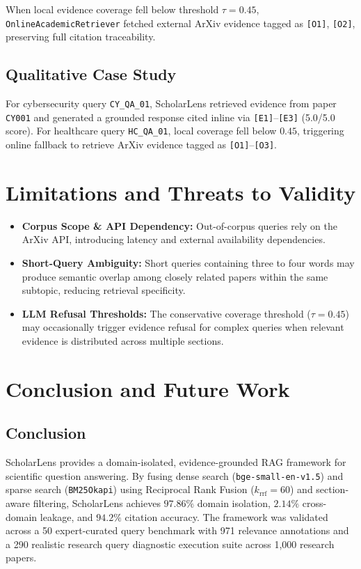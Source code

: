 \documentclass[conference]{IEEEtran}
\begin{document}
When local evidence coverage fell below threshold $\tau=0.45$, \texttt{OnlineAcademicRetriever} fetched external ArXiv evidence tagged as \texttt{[O1]}, \texttt{[O2]}, preserving full citation traceability.

\subsection{Qualitative Case Study}

For cybersecurity query \texttt{CY\_QA\_01}, ScholarLens retrieved evidence from paper \texttt{CY001} and generated a grounded response cited inline via \texttt{[E1]}--\texttt{[E3]} (5.0/5.0 score). For healthcare query \texttt{HC\_QA\_01}, local coverage fell below $0.45$, triggering online fallback to retrieve ArXiv evidence tagged as \texttt{[O1]}--\texttt{[O3]}.

\section{Limitations and Threats to Validity}

\begin{itemize}
    \item \textbf{Corpus Scope \& API Dependency:} Out-of-corpus queries rely on the ArXiv API, introducing latency and external availability dependencies.
    \item \textbf{Short-Query Ambiguity:} Short queries containing three to four words may produce semantic overlap among closely related papers within the same subtopic, reducing retrieval specificity.
    \item \textbf{LLM Refusal Thresholds:} The conservative coverage threshold ($\tau=0.45$) may occasionally trigger evidence refusal for complex queries when relevant evidence is distributed across multiple sections.
\end{itemize}

\section{Conclusion and Future Work}

\subsection{Conclusion}

ScholarLens provides a domain-isolated, evidence-grounded RAG framework for scientific question answering. By fusing dense search (\texttt{bge-small-en-v1.5}) and sparse search (\texttt{BM25Okapi}) using Reciprocal Rank Fusion ($k_{\text{rrf}}=60$) and section-aware filtering, ScholarLens achieves $97.86\%$ domain isolation, $2.14\%$ cross-domain leakage, and $94.2\%$ citation accuracy. The framework was validated across a 50 expert-curated query benchmark with 971 relevance annotations and a 290 realistic research query diagnostic execution suite across 1,000 research papers.
\end{document}
